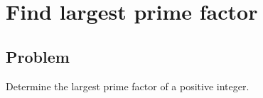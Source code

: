 
\section{Find largest prime factor}



\subsection*{Problem}

Determine the largest prime factor of a positive integer.
